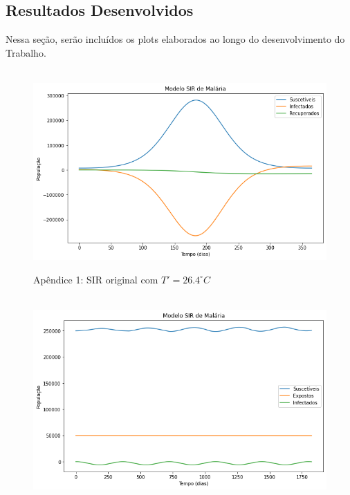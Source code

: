 \documentclass[
	12pt,				%
	oneside,			%
	a4paper,			%
	english,			%
	brazil				%
	]{abntex2}
\begin{document}
\begin{apendicesenv}

\partapendices

\chapter{Resultados Desenvolvidos}
Nessa seção, serão incluídos os plots 
elaborados ao longo do desenvolvimento do Trabalho.


\begin{figure}[!ht]
	\centering
	\hbox{\hspace{2.0em} \includegraphics[scale=0.55] {SIR_a_incorreto.png}}
	\caption*{Apêndice 1: SIR original com $T'=26.4^\circ C$}
\end{figure} 
\begin{figure}[!ht]
	\centering
	\hbox{\hspace{2.5em} \includegraphics[scale=0.55] {SEI_a_incorreto.png}}

\end{figure}
\end{apendicesenv}
\end{document}
